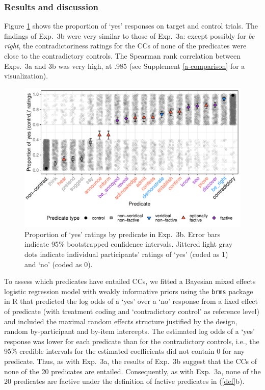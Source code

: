 \documentclass[11pt,fleqn]{article}
\newcommand{\6}{\mbox{$[\hspace*{-.6mm}[$}}
\newcommand{\9}{\mbox{$]\hspace*{-.6mm}]$}}
\begin{document}
{\subsubsection{Results and discussion}

Figure \ref{fig:3bresults} shows the proportion of `yes' responses on target and control trials. The findings of Exp.~3b were very similar to those of Exp.~3a: except possibly for {\em be right}, the contradictoriness ratings for the CCs of none of the predicates were close to the contradictory controls. The Spearman rank correlation between Exps.~3a and 3b was very high, at .985 (see Supplement \ref{a-comparison} for a visualization).

\begin{figure}[h!]
\centering
\includegraphics[width=.7\paperwidth]{../../results/6-veridicality2-binary/graphs/proportion-by-predicate-variability-individual}
\caption{Proportion of `yes' ratings by predicate in Exp.~3b. Error bars indicate 95\% bootstrapped confidence intervals. Jittered light gray dots indicate individual participants' ratings of `yes' (coded as 1) and `no' (coded as 0). }
\label{fig:3bresults}
\end{figure}

To assess which predicates have entailed CCs, we fitted a Bayesian mixed effects logistic regression model with weakly informative priors using the \verb|brms|  package in R that predicted the log odds of a `yes' over a `no' response from a fixed effect of predicate (with treatment coding and `contradictory control' as  reference level) and included the maximal random effects structure justified by the design, random by-participant and by-item intercepts. The estimated log odds of a `yes' response was lower for each predicate than for the contradictory controls, i.e., the 95\% credible intervals for the estimated coefficients did not contain 0 for any predicate. Thus, as with Exp.~3a, the results of Exp.~3b suggest that the CCs of none of the 20 predicates are entailed. Consequently, as with Exp.~3a, none of the 20 predicates are factive under the definition of factive predicates in (\ref{def}b). 

}
\end{document}
